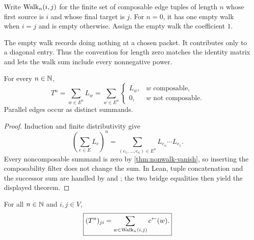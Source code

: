 Write $\operatorname{Walk}_n(i,j)$ for the finite set of composable edge tuples of length $n$
whose first source is $i$ and whose final target is $j$. For $n=0$, it has
one empty walk when $i=j$ and is empty otherwise. Assign the empty walk the
coefficient $1$.

\begin{interpretation}[title={The empty walk}]
The empty walk records doing nothing at a chosen packet. It contributes only
to a diagonal entry. Thus the convention for length zero matches the identity
matrix and lets the walk sum include every nonnegative power.
\end{interpretation}

\begin{theorem}
\label{thm:word-to-walk}
For every $n\in\mathbb N$,
\[
  \boxed{
  T^n
  =
  \sum_{w\in E^n}L_w
  =
  \sum_{w\in E^n}
  \begin{cases}
  L_w,&w\text{ composable},\\
  0,&w\text{ not composable}.
  \end{cases}
  }
\]
Parallel edges occur as distinct summands.
\end{theorem}

\begin{proof}
Induction and finite distributivity give
\[
\left(\sum_{e\in E}L_e\right)^n
=
\sum_{(e_1,\ldots,e_n)\in E^n}L_{e_n}\cdots L_{e_1}.
\]
Every noncomposable summand is zero by
\cref{thm:nonwalk-vanish}, so inserting the composability filter does not
change the sum.  In Lean, tuple concatenation and the successor sum are
handled by  and
; the two bridge equalities then yield
the displayed theorem.
\end{proof}

\begin{corollary}
\label{cor:word-to-walk-entry}
For all $n\in\mathbb N$ and $i,j\in V$,
\[
  \boxed{
  (T^n)_{ji}
  =
  \sum_{w\in\operatorname{Walk}_n(i,j)}c^\leftarrow(w).
  }
\]
\end{corollary}

